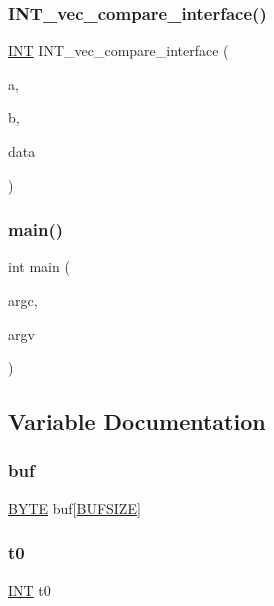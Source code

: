 \subsubsection{\texorpdfstring{I\+N\+T\+\_\+vec\+\_\+compare\+\_\+interface()}{INT\_vec\_compare\_interface()}}
{\footnotesize\ttfamily \mbox{\hyperlink{galois_8h_a09fddde158a3a20bd2dcadb609de11dc}{I\+NT}} I\+N\+T\+\_\+vec\+\_\+compare\+\_\+interface (\begin{DoxyParamCaption}\item[{void $\ast$}]{a,  }\item[{void $\ast$}]{b,  }\item[{void $\ast$}]{data }\end{DoxyParamCaption})}

\mbox{\label{tdo__can_8_c_a3c04138a5bfe5d72780bb7e82a18e627}} 
\subsubsection{\texorpdfstring{main()}{main()}}
{\footnotesize\ttfamily int main (\begin{DoxyParamCaption}\item[{int}]{argc,  }\item[{char $\ast$$\ast$}]{argv }\end{DoxyParamCaption})}



\subsection{Variable Documentation}
\mbox{\label{tdo__can_8_c_a271269b6eb6a530467c611f562cad9ee}} 
\subsubsection{\texorpdfstring{buf}{buf}}
{\footnotesize\ttfamily \mbox{\hyperlink{galois_8h_ab6cc7b4aeb6ea31aba2b3fbfc83ff5e6}{B\+Y\+TE}} buf\mbox{[}\mbox{\hyperlink{galois_8h_aeca034f67218340ecb2261a22c2f3dcd}{B\+U\+F\+S\+I\+ZE}}\mbox{]}}

\mbox{\label{tdo__can_8_c_a4268f4fe222ffb119218a0199f5e1904}} 
\subsubsection{\texorpdfstring{t0}{t0}}
{\footnotesize\ttfamily \mbox{\hyperlink{galois_8h_a09fddde158a3a20bd2dcadb609de11dc}{I\+NT}} t0}

